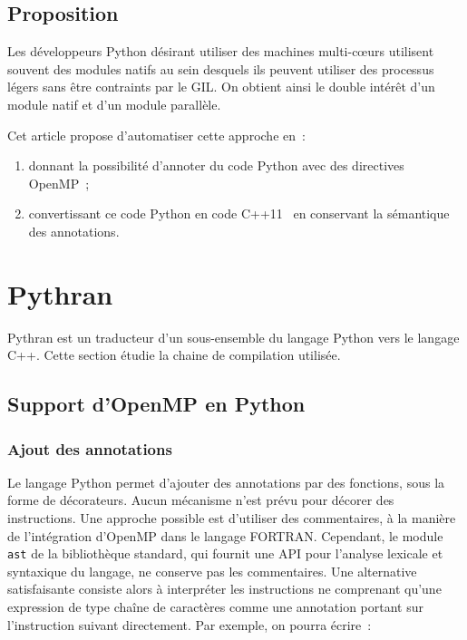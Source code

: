 \documentclass[renpar]{compas2013}
\begin{document}
\subsection{Proposition}

Les développeurs Python désirant utiliser des machines multi-cœurs
utilisent souvent des modules natifs au sein desquels ils peuvent utiliser
des processus légers sans être contraints par le GIL. On obtient ainsi le
double intérêt d'un module natif et d'un module parallèle.

Cet article propose d'automatiser cette approche en~:
\begin{enumerate}
  \item donnant la possibilité d'annoter du code Python avec des
	directives OpenMP~\cite{openmp3.1};
  \item convertissant ce code Python en code C++11~\cite{isocxx11} en conservant la
	sémantique des annotations.
\end{enumerate}


\section{Pythran}\label{sec:pythran}

Pythran est un traducteur d'un sous-ensemble du langage Python vers le
langage C++. Cette section étudie la chaine de compilation utilisée.

\subsection{Support d'OpenMP en Python}
\label{sec:python-openmp}

\subsubsection{Ajout des annotations}

Le langage Python permet d'ajouter des annotations par des fonctions, sous
la forme de décorateurs. Aucun mécanisme n'est prévu pour décorer des
instructions. Une approche possible est d'utiliser des commentaires, à la
manière de l'intégration d'OpenMP dans le langage FORTRAN. Cependant, le
module \texttt{ast} de la bibliothèque standard, qui fournit une API pour
l'analyse lexicale et syntaxique du langage, ne conserve pas les
commentaires. Une alternative satisfaisante consiste alors à interpréter
les instructions ne comprenant qu'une expression de type chaîne de
caractères comme une annotation portant sur l'instruction suivant
directement. Par exemple, on pourra écrire~:
\end{document}
